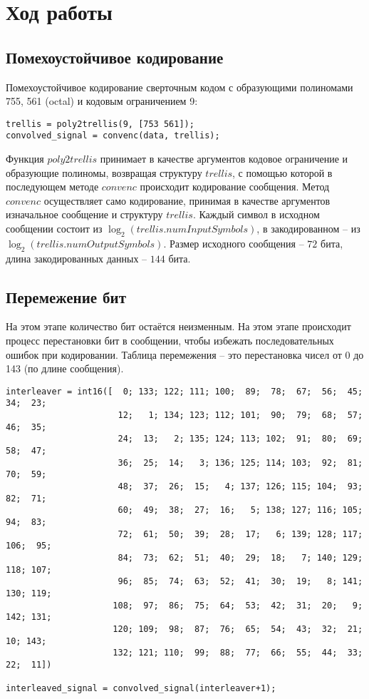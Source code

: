 \documentclass[a4paper]{article}
\begin{document}
\section{Ход работы}
\subsection{Помехоустойчивое кодирование}
Помехоустойчивое кодирование сверточным кодом с образующими полиномами 755, 561 (octal) и кодовым ограничением 9:
\begin{lstlisting}
trellis = poly2trellis(9, [753 561]);
convolved_signal = convenc(data, trellis);
\end{lstlisting}
Функция $poly2trellis$ принимает в качестве аргументов кодовое ограничение и образующие полиномы, возвращая структуру
$trellis$, с помощью которой в последующем методе $convenc$ происходит кодирование сообщения.
Метод $convenc$ осуществляет само кодирование, принимая в качестве аргументов изначальное сообщение и структуру
$trellis$. Каждый символ в исходном сообщении состоит из $\log_2(trellis.numInputSymbols)$, в закодированном --
из $\log_2(trellis.numOutputSymbols)$.
Размер исходного сообщения -- $72$ бита, длина закодированных данных -- $144$ бита.
\newpage
\subsection{Перемежение бит}
На этом этапе количество бит остаётся неизменным. На этом этапе происходит процесс перестановки бит в сообщении,
чтобы избежать последовательных ошибок при кодировании. Таблица перемежения -- это перестановка чисел от 0 до 143
(по длине сообщения).
\begin{lstlisting}
interleaver = int16([  0; 133; 122; 111; 100;  89;  78;  67;  56;  45;  34;  23;
                      12;   1; 134; 123; 112; 101;  90;  79;  68;  57;  46;  35;
                      24;  13;   2; 135; 124; 113; 102;  91;  80;  69;  58;  47;
                      36;  25;  14;   3; 136; 125; 114; 103;  92;  81;  70;  59; 
                      48;  37;  26;  15;   4; 137; 126; 115; 104;  93;  82;  71;
                      60;  49;  38;  27;  16;   5; 138; 127; 116; 105;  94;  83; 
                      72;  61;  50;  39;  28;  17;   6; 139; 128; 117; 106;  95;
                      84;  73;  62;  51;  40;  29;  18;   7; 140; 129; 118; 107; 
                      96;  85;  74;  63;  52;  41;  30;  19;   8; 141; 130; 119;
                     108;  97;  86;  75;  64;  53;  42;  31;  20;   9; 142; 131;
                     120; 109;  98;  87;  76;  65;  54;  43;  32;  21;  10; 143; 
                     132; 121; 110;  99;  88;  77;  66;  55;  44;  33;  22;  11])

interleaved_signal = convolved_signal(interleaver+1);
\end{lstlisting}
\end{document}
